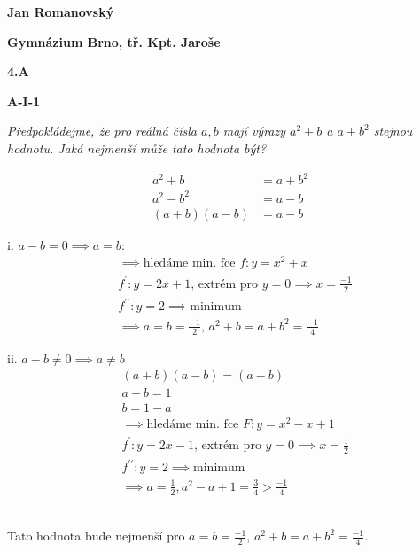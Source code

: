 \documentclass{article}
\title{\vspace{-2cm}\vspace{-1.7cm}}
\date{}
\author{}
\begin{document}
\maketitle
\noindent \textbf{Jan Romanovský}

\noindent \textbf{Gymnázium Brno, tř. Kpt. Jaroše}

\noindent \textbf{4.A}

\noindent \textbf{A-\textrm{I}-1}

\textbf{ }

\textit{Předpokládejme, že pro reálná čísla $a, b$ mají výrazy $a^2 + b$ a $a + b^2$ stejnou hodnotu. Jaká nejmenší může tato hodnota být?}

\textbf{ }

\begin{align*}
  a^2 + b &= a + b^2\\
  a^2 - b^2 &= a-b\\
  (a+b)(a-b) &= a-b
\end{align*}

\textbf{ }

{\begin{minipage}[t]{0.49\textwidth}
    i. $a-b=0 \implies a =b$:
  \begin{align*}
    &\implies \text{hledáme min. fce } f: y = x^2 + x\\
    &f^\prime :y = 2x + 1 \text{, extrém pro } y = 0 \implies x = \frac{-1}{2}\\
    &f^{\prime \prime}: y = 2 \implies \text{minimum}\\
    &\implies a = b = \frac{-1}{2} \text{, } a^2 + b = a + b^2 = \frac{-1}{4}
  \end{align*}
\end{minipage}
\hfill
\noindent\begin{minipage}[t]{0.49\textwidth}
    ii. $a-b \neq 0 \implies a \neq b$
  \begin{align*}
    &(a+b)(a-b)=(a-b)\\
    &a+b = 1\\
  &b = 1-a\\
    &\implies \text{hledáme min. fce } F: y = x^2 -x +1\\
    &f^\prime: y = 2x -1 \text{, extrém pro } y = 0 \implies x = \frac{1}{2}\\
    &f^{\prime \prime}:y =2 \implies \text{minimum}\\
    &\implies a = \frac{1}{2}, a^2 - a + 1 = \frac{3}{4} > \frac{-1}{4}
  \end{align*}
\end{minipage}}

\,\\

Tato hodnota bude nejmenší pro $a = b = \frac{-1}{2}$, $a^2 + b = a + b^2 = \frac{-1}{4}$.
\end{document}
